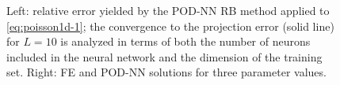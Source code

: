 \documentclass[12pt, a4paper, twoside, openright, notitlepage]{report}
\numberwithin{equation}{chapter}
\theoremstyle{theorem}
\theoremstyle{definition}
\theoremstyle{remark}
\theoremstyle{proposition}
\numberwithin{figure}{chapter}
\begin{document}
\begin{figure}[t!]
			
			\caption{Left: relative error yielded by the POD-NN RB method applied to \eqref{eq:poisson1d-1}; the convergence to the projection error (solid line) for $L = 10$ is analyzed in terms of both the number of neurons included in the neural network and the dimension of the training set. Right: FE and POD-NN solutions for three parameter values.}
			\label{fig:poisson1d-1-fig3}
		\end{figure}
		
\end{document}
